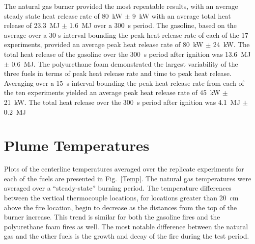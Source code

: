 \documentclass[twoside]{uocthesis}
\begin{document}
{{The natural gas burner provided the most repeatable results, with an average steady state heat release rate of 80~kW $\pm$ 9~kW with an average total heat release of 23.3~MJ $\pm$ 1.6~MJ over a 300~s period.  The gasoline, based on the average over a 30 s interval bounding the peak heat release rate of each of the 17 experiments, provided an average peak heat release rate of 80~kW $\pm$ 24~kW.  The total heat release of the gasoline over the 300~s period after ignition was 13.6~MJ $\pm$ 0.6~MJ.  The polyurethane foam demonstrated the largest variability of the three fuels in terms of peak heat release rate and time to peak heat release.  Averaging over a 15~s interval bounding the peak heat release rate from each of the ten experiments yielded an average peak heat release rate of 45~kW $\pm$ 21~kW.  The total heat release over the 300~s period after ignition was 4.1~MJ $\pm$ 0.2~MJ


\section{Plume Temperatures}

Plots of the centerline temperatures averaged over the replicate experiments for each of the fuels are presented in Fig.~\ref{Temp}. The natural gas temperatures were averaged over a ``steady-state'' burning period.  The temperature differences between the vertical thermocouple locations, for locations greater than 20~cm above the fire location, begin to decrease as the distances from the top of the burner increase.  This trend is similar for both the gasoline fires and the polyurethane foam fires as well.  The most notable difference between the natural gas and the other fuels is the growth and decay of the fire during the test period.

}}
\end{document}
